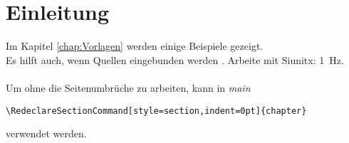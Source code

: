 \chapter{Einleitung}
Im Kapitel \ref{chap:Vorlagen} werden einige Beispiele gezeigt.\\
Es hilft auch, wenn Quellen eingebunden werden \cite{Demtroeder1, Demtroeder2, DemtroederLaser}. Arbeite mit Siunitx: \SI{1}{\Hz}.
\\ \\
Um ohne die Seitenumbrüche zu arbeiten, kann in \textit{main}
\begin{verbatim}
\RedeclareSectionCommand[style=section,indent=0pt]{chapter} 
\end{verbatim}
verwendet werden.
